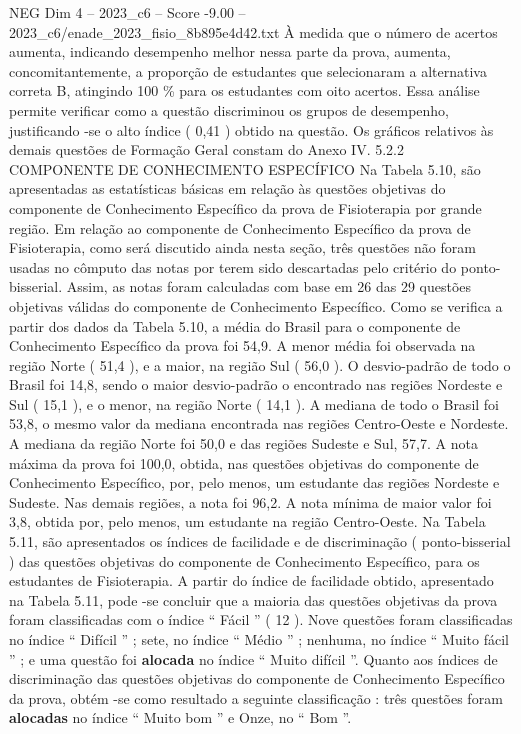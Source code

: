 \begin{textsample}{NEG Dim 4 – 2023\_c6 – Score -9.00 – 2023\_c6/enade\_2023\_fisio\_8b895e4d42.txt}
À medida que o número de acertos aumenta, indicando desempenho melhor nessa parte da prova, aumenta, concomitantemente, a proporção de estudantes que selecionaram a alternativa correta B, atingindo 100 \% para os estudantes com oito acertos.
Essa análise permite verificar como a questão discriminou os grupos de desempenho, justificando -se o alto índice ( 0,41 ) obtido na questão.
Os gráficos relativos às demais questões de Formação Geral constam do Anexo IV. 5.2.2 COMPONENTE DE CONHECIMENTO ESPECÍFICO Na Tabela 5.10, são apresentadas as estatísticas básicas em relação às questões objetivas do componente de Conhecimento Específico da prova de Fisioterapia por grande região.
Em relação ao componente de Conhecimento Específico da prova de Fisioterapia, como será discutido ainda nesta seção, três questões não foram usadas no cômputo das notas por terem sido descartadas pelo critério do ponto-bisserial.
Assim, as notas foram calculadas com base em 26 das 29 questões objetivas válidas do componente de Conhecimento Específico.
Como se verifica a partir dos dados da Tabela 5.10, a média do Brasil para o componente de Conhecimento Específico da prova foi 54,9.
A menor média foi observada na região Norte ( 51,4 ), e a maior, na região Sul ( 56,0 ).
O desvio-padrão de todo o Brasil foi 14,8, sendo o maior desvio-padrão o encontrado nas regiões Nordeste e Sul ( 15,1 ), e o menor, na região Norte ( 14,1 ).
A mediana de todo o Brasil foi 53,8, o mesmo valor da mediana encontrada nas regiões Centro-Oeste e Nordeste.
A mediana da região Norte foi 50,0 e das regiões Sudeste e Sul, 57,7.
A nota máxima da prova foi 100,0, obtida, nas questões objetivas do componente de Conhecimento Específico, por, pelo menos, um estudante das regiões Nordeste e Sudeste.
Nas demais regiões, a nota foi 96,2.
A nota mínima de maior valor foi 3,8, obtida por, pelo menos, um estudante na região Centro-Oeste.
Na Tabela 5.11, são apresentados os índices de facilidade e de discriminação ( ponto-bisserial ) das questões objetivas do componente de Conhecimento Específico, para os estudantes de Fisioterapia.
A partir do índice de facilidade obtido, apresentado na Tabela 5.11, pode -se concluir que a maioria das questões objetivas da prova foram classificadas com o índice “ Fácil ” ( 12 ).
Nove questões foram classificadas no índice “ Difícil ” ; sete, no índice “ Médio ” ; nenhuma, no índice “ Muito fácil ” ; e uma questão foi \textbf{alocada} no índice “ Muito difícil ”.
Quanto aos índices de discriminação das questões objetivas do componente de Conhecimento Específico da prova, obtém -se como resultado a seguinte classificação : três questões foram \textbf{alocadas} no índice “ Muito bom ” e Onze, no “ Bom ”.

\end{textsample}
